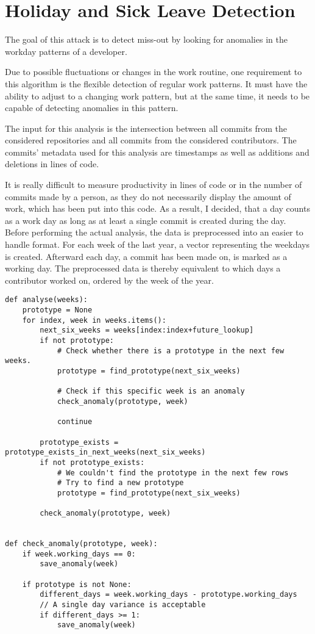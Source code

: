 \section{Holiday and Sick Leave Detection}

The goal of this attack is to detect miss-out by looking for anomalies in the workday patterns of a developer.

Due to possible fluctuations or changes in the work routine, one requirement to this algorithm is the flexible detection of regular work patterns.
It must have the ability to adjust to a changing work pattern, but at the same time, it needs to be capable of detecting anomalies in this pattern.

The input for this analysis is the intersection between all commits from the considered repositories and all commits from the considered contributors.
The commits' metadata used for this analysis are timestamps as well as additions and deletions in lines of code.

It is really difficult to measure productivity in lines of code or in the number of commits made by a person, as they do not necessarily display the amount of work, which has been put into this code.
As a result, I decided, that a day counts as a work day as long as at least a single commit is created during the day.
Before performing the actual analysis, the data is preprocessed into an easier to handle format.
For each week of the last year, a vector representing the weekdays is created.
Afterward each day, a commit has been made on, is marked as a working day.
The preprocessed data is thereby equivalent to which days a contributor worked on, ordered by the week of the year.

\begin{verbatim}
def analyse(weeks):
    prototype = None
    for index, week in weeks.items():
        next_six_weeks = weeks[index:index+future_lookup]
        if not prototype:
            # Check whether there is a prototype in the next few weeks.
            prototype = find_prototype(next_six_weeks)

            # Check if this specific week is an anomaly
            check_anomaly(prototype, week)

            continue

        prototype_exists = prototype_exists_in_next_weeks(next_six_weeks)
        if not prototype_exists:
            # We couldn't find the prototype in the next few rows
            # Try to find a new prototype
            prototype = find_prototype(next_six_weeks)

        check_anomaly(prototype, week)


def check_anomaly(prototype, week):
    if week.working_days == 0:
        save_anomaly(week)

    if prototype is not None:
        different_days = week.working_days - prototype.working_days
        // A single day variance is acceptable
        if different_days >= 1:
            save_anomaly(week)

\end{verbatim}
\begingroup
{}\label{lst:miss-out-algorithm}
\endgroup


